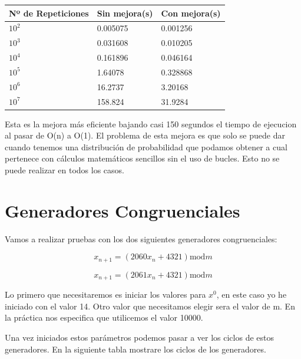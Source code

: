 \documentclass[]{article}
\begin{document}
\begin{table}[H]
	\begin{center}
		\begin{tabular}{|l|l|l|}
			
			\hline
			Nº de Repeticiones & Sin mejora(s) & Con mejora(s)\\
			\hline \hline
			$10^{2}$ & 0.005075  &  0.001256
			\\ \hline
			$10^{3}$ & 0.031608  &  0.010205
			\\ \hline
			$10^{4}$ & 0.161896  &  0.046164
			\\ \hline
			$10^{5}$ & 1.64078 &  0.328868
			\\ \hline
			$10^{6}$ &  16.2737 &  3.20168
			\\ \hline
			$10^{7}$ & 158.824  &  31.9284
			\\ \hline
		\end{tabular}
		
		\label{tabla:sencilla}
	\end{center}
\end{table}

Esta es la mejora más eficiente bajando casi 150 segundos el tiempo de ejecucion al pasar de O(n) a O(1). El problema de esta mejora es que solo se puede dar cuando tenemos una distribución de probabilidad que podamos obtener a cual pertenece con cálculos matemáticos sencillos sin el uso de bucles. Esto no se puede realizar en todos los casos.

\section{Generadores Congruenciales}

Vamos a realizar pruebas con los dos siguientes generadores congruenciales:

$$
x_{n+1}=\left(2060 x_{n}+4321\right) \mathrm{mod} m
$$
 
$$
x_{n+1}=\left(2061 x_{n}+4321\right) \mathrm{mod} m
$$
	
Lo primero que necesitaremos es iniciar los valores para $x^{0}$, en este caso yo he iniciado con el valor 14. Otro valor que necesitamos elegir sera el valor de m. En la práctica nos especifica que utilicemos el valor 10000. 

Una vez iniciados estos parámetros podemos pasar a ver los ciclos de estos generadores. En la siguiente tabla mostrare los ciclos de los generadores.
\end{document}
